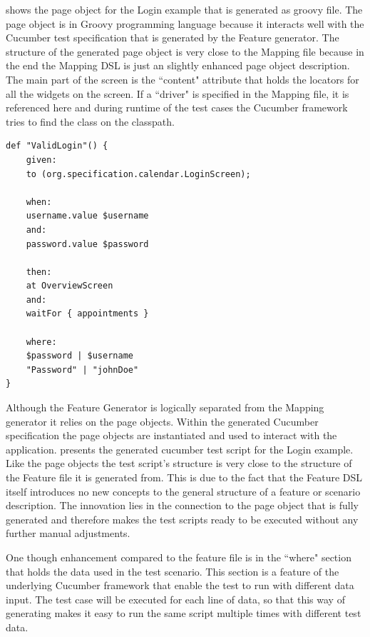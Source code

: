 \documentclass{sig-alternate-05-2015}
\begin{document}
 shows the page object for the Login example that is generated as groovy file.
The page object is in Groovy programming language because it interacts well with the Cucumber test specification that is generated by the Feature generator.
The structure of the generated page object is very close to the Mapping file because in the end the Mapping DSL is just an slightly enhanced page object description.
The main part of the screen is the ``content" attribute that holds the locators for all the widgets on the screen.
If a ``driver" is specified in the Mapping file, it is referenced here and during runtime of the test cases the Cucumber framework tries to find the class on the classpath.

\begin{lstlisting}[captionpos=b, caption=Generated Feature File, label={lst:featureGenerated}, language=dsl]
	def "ValidLogin"() {
	given:
	to (org.specification.calendar.LoginScreen);
	
	when:
	username.value $username
	and:
	password.value $password
	
	then:
	at OverviewScreen
	and:
	waitFor { appointments }
	
	where:
	$password | $username
	"Password" | "johnDoe"
}
\end{lstlisting}

Although the Feature Generator is logically separated from the Mapping generator it relies on the page objects.
Within the generated Cucumber specification the page objects are instantiated and used to interact with the application.
 presents the generated cucumber test script for the Login example. 
Like the page objects the test script's structure is very close to the structure of the Feature file it is generated from.
This is due to the fact that the Feature DSL itself introduces no new concepts to the general structure of a feature or scenario description.
The innovation lies in the connection to the page object that is fully generated and therefore makes the test scripts ready to be executed without any further manual adjustments.

One though enhancement compared to the feature file is in the ``where" section that holds the data used in the test scenario.
This section is a feature of the underlying Cucumber framework that enable the test to run with different data input. 
The test case will be executed for each line of data, so that this way of generating makes it easy to run the same script multiple times with different test data.
\end{document}
